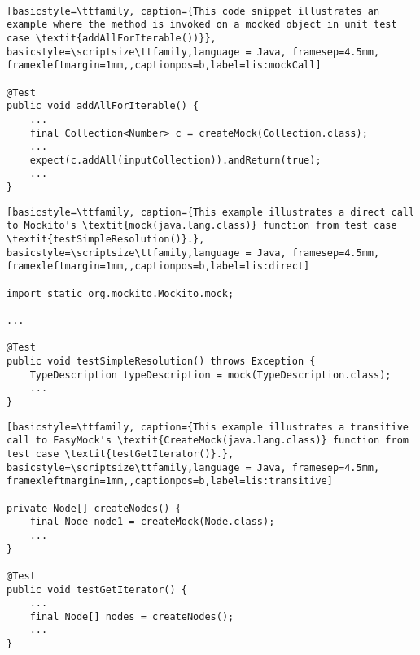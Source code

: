 ‎

\begin{lstlisting}[basicstyle=\ttfamily, caption={This code snippet illustrates an example where the method is invoked on a mocked object in unit test case \textit{addAllForIterable())}},
basicstyle=\scriptsize\ttfamily,language = Java, framesep=4.5mm,
framexleftmargin=1mm,,captionpos=b,label=lis:mockCall]

@Test
public void addAllForIterable() {
	...
	final Collection<Number> c = createMock(Collection.class);
	...
	expect(c.addAll(inputCollection)).andReturn(true);
	...
}

\end{lstlisting}

\begin{lstlisting}[basicstyle=\ttfamily, caption={This example illustrates a direct call to Mockito's \textit{mock(java.lang.class)} function from test case \textit{testSimpleResolution()}.},
basicstyle=\scriptsize\ttfamily,language = Java, framesep=4.5mm,
framexleftmargin=1mm,,captionpos=b,label=lis:direct]

import static org.mockito.Mockito.mock;

...

@Test
public void testSimpleResolution() throws Exception {
	TypeDescription typeDescription = mock(TypeDescription.class);
	...
}

\end{lstlisting}

\begin{lstlisting}[basicstyle=\ttfamily, caption={This example illustrates a transitive call to EasyMock's \textit{CreateMock(java.lang.class)} function from test case \textit{testGetIterator()}.},
basicstyle=\scriptsize\ttfamily,language = Java, framesep=4.5mm,
framexleftmargin=1mm,,captionpos=b,label=lis:transitive]

private Node[] createNodes() {
	final Node node1 = createMock(Node.class);
	...
}

@Test
public void testGetIterator() {
	...
	final Node[] nodes = createNodes();
	...
}

\end{lstlisting}